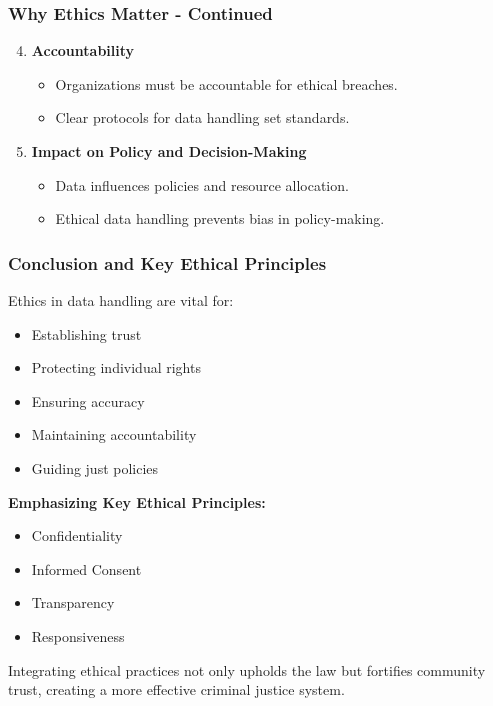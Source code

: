 \documentclass[aspectratio=169]{beamer}
\begin{document}
\begin{frame}[fragile]
    \frametitle{Why Ethics Matter - Continued}
    \begin{enumerate}
        \setcounter{enumi}{3} %
        \item \textbf{Accountability}
        \begin{itemize}
            \item Organizations must be accountable for ethical breaches.
            \item Clear protocols for data handling set standards.
        \end{itemize}

        \item \textbf{Impact on Policy and Decision-Making}
        \begin{itemize}
            \item Data influences policies and resource allocation.
            \item Ethical data handling prevents bias in policy-making.
        \end{itemize}
    \end{enumerate}
\end{frame}

\begin{frame}[fragile]
    \frametitle{Conclusion and Key Ethical Principles}
    Ethics in data handling are vital for:
    \begin{itemize}
        \item Establishing trust
        \item Protecting individual rights
        \item Ensuring accuracy
        \item Maintaining accountability
        \item Guiding just policies
    \end{itemize}
    
    \textbf{Emphasizing Key Ethical Principles:}
    \begin{itemize}
        \item Confidentiality
        \item Informed Consent
        \item Transparency
        \item Responsiveness
    \end{itemize}

    Integrating ethical practices not only upholds the law but fortifies community trust, creating a more effective criminal justice system.
\end{frame}
\end{document}
